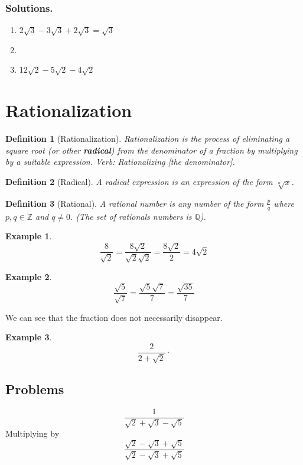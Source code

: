\documentclass{article}
\newtheorem{definition}{Definition}
\newtheorem{example}{Example}
\begin{document}
\subsubsection{Solutions.} %
\begin{enumerate}
    \item $2\sqrt{3} - 3\sqrt{3} + 2\sqrt{3} = \sqrt{3}$
    \item 
    \item $12\sqrt{2} - 5\sqrt{2} - 4\sqrt{2}$
\end{enumerate}


\section{Rationalization}
\begin{definition}[Rationalization]
    Rationalization is the process of eliminating a square root (or other \textbf{radical}) from the denominator of a fraction by multiplying by a suitable expression. Verb: Rationalizing [the denominator].
\end{definition}

\begin{definition}[Radical]
    A radical expression is an expression of the form $\sqrt[n]{x}$.
\end{definition}

\begin{definition}[Rational]
    A rational number is any number of the form $\frac{p}{q}$ where
$p,q\in\mathbb{Z}$ and $q\ne0$. (The set of rationals numbers is $\mathbb{Q}$).
\end{definition}

\begin{example}
    \[
    \frac{8}{\sqrt{2}} = \frac{8\sqrt{2}}{\sqrt{2}\sqrt{2}} = \frac{8\sqrt{2}}{2} = 4\sqrt{2}
    \]
\end{example}
\begin{example}
    \[
    \frac{\sqrt{5}}{\sqrt{7}}
    = \frac{\sqrt{5}\sqrt{7}}{7}
    = \frac{\sqrt{35}}{7}
    \]
\end{example}
We can see that the fraction does not necessarily disappear.
\begin{example}
    \[
    \frac{2}{2 + \sqrt{2}} \cdot 
    \]
\end{example}

\subsection{Problems}
\[
\frac{1}{\sqrt{2} + \sqrt{3} - \sqrt{5}}
\]
Multiplying by
\[
\frac{\sqrt{2} - \sqrt{3} + \sqrt{5}}{\sqrt{2} - \sqrt{3} + \sqrt{5}}
\]
\end{document}
